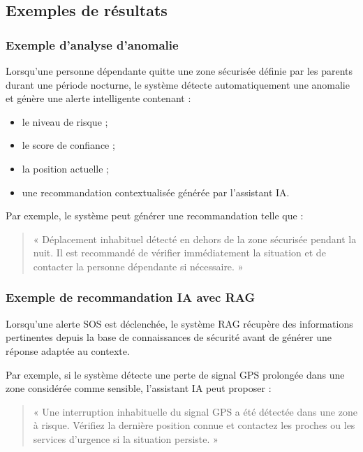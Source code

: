 \subsection{Exemples de résultats}

\subsubsection{Exemple d’analyse d’anomalie}

Lorsqu’une personne dépendante quitte une zone sécurisée définie par les parents durant une période nocturne, le système détecte automatiquement une anomalie et génère une alerte intelligente contenant :

\begin{itemize}
    \item le niveau de risque ;
    \item le score de confiance ;
    \item la position actuelle ;
    \item une recommandation contextualisée générée par l’assistant IA.
\end{itemize}

Par exemple, le système peut générer une recommandation telle que :

\begin{quote}
« Déplacement inhabituel détecté en dehors de la zone sécurisée pendant la nuit. Il est recommandé de vérifier immédiatement la situation et de contacter la personne dépendante si nécessaire. »
\end{quote}

\subsubsection{Exemple de recommandation IA avec RAG}

Lorsqu’une alerte SOS est déclenchée, le système RAG récupère des informations pertinentes depuis la base de connaissances de sécurité avant de générer une réponse adaptée au contexte.

Par exemple, si le système détecte une perte de signal GPS prolongée dans une zone considérée comme sensible, l’assistant IA peut proposer :

\begin{quote}
« Une interruption inhabituelle du signal GPS a été détectée dans une zone à risque. Vérifiez la dernière position connue et contactez les proches ou les services d’urgence si la situation persiste. »
\end{quote}

